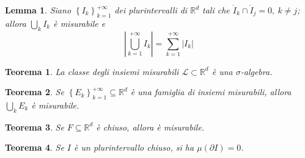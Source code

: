 \documentclass[11pt]{article}
\theoremstyle{style}
\newtheorem{teorema}{Teorema}[section]
\newtheorem{lemma}{Lemma}[teorema]
\numberwithin{equation}{subsection}
\begin{document}
\begin{lemma}
	Siano $\left\{ I_k \right\} _{k=1} ^{+\infty} $ dei plurintervalli di $\mathbb{R}^d$ tali che $\mathring{I}_k \cap \mathring{I}_j = 0, \ k\neq j$; allora $\bigcup_k I_k$ \`e misurabile e 
	\[
 \left\lvert \bigcup_{k=1} ^{+\infty} I_k \right\rvert = \sum_{k=1}^{+\infty} \lvert I_k \rvert 
	\] 
\end{lemma}
\begin{teorema}
	La classe degli insiemi misurabili $\mathscr{L} \subset \mathbb{R}^d$ \`e una $\sigma $-algebra.
\end{teorema}
\begin{teorema}
	Se $\left\{ E_k \right\} _{k=1} ^{+\infty} \subseteq \mathbb{R}^d$ \`e una famiglia di insiemi misurabili, allora $\bigcup_k E_k$ \`e misurabile.
\end{teorema}
\begin{teorema}
	Se $F\subseteq \mathbb{R}^d$ \`e chiuso, allora \`e misurabile.
\end{teorema}
\begin{teorema}
	Se $I$ \`e un plurintervallo chiuso, si ha $\mu (\partial I) = 0$.
\end{teorema}
\end{document}

